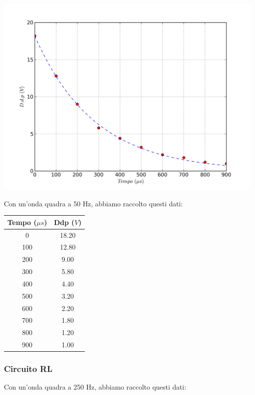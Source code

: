 \begin{center}
 \includegraphics[scale=0.70]{grafici/C3/fitcond.png}
\end{center}


Con un'onda quadra a 50 Hz, abbiamo raccolto questi dati:
\begin{center}
\begin{tabular}{*{2}{c}}
Tempo ($\mu s$) & Ddp ($V$) \\
\midrule
0 & 18.20 \\
100 & 12.80 \\
200 & 9.00 \\
300 & 5.80 \\
400 & 4.40 \\
500 & 3.20 \\
600 & 2.20 \\
700 & 1.80 \\
800 & 1.20 \\
900 & 1.00 \\
\end{tabular}
\end{center}


\subsubsection{Circuito RL}
Con un'onda quadra a 250 Hz, abbiamo raccolto questi dati:


